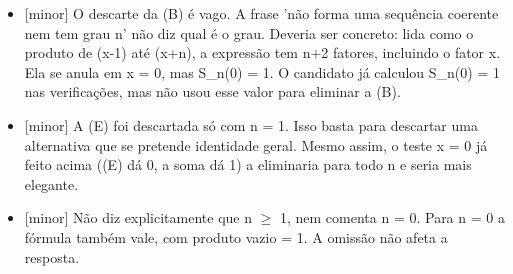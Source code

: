 \documentclass{article}%
\begin{document}
\begin{itemize}%
\item%
{[}minor{]} O descarte da (B) é vago. A frase 'não forma uma sequência coerente nem tem grau n' não diz qual é o grau. Deveria ser concreto: lida como o produto de (x-1) até (x+n), a expressão tem n+2 fatores, incluindo o fator x. Ela se anula em x = 0, mas S\_n(0) = 1. O candidato já calculou S\_n(0) = 1 nas verificações, mas não usou esse valor para eliminar a (B).%
\item%
{[}minor{]} A (E) foi descartada só com n = 1. Isso basta para descartar uma alternativa que se pretende identidade geral. Mesmo assim, o teste x = 0 já feito acima ((E) dá 0, a soma dá 1) a eliminaria para todo n e seria mais elegante.%
\item%
{[}minor{]} Não diz explicitamente que n $\geq$ 1, nem comenta n = 0. Para n = 0 a fórmula também vale, com produto vazio = 1. A omissão não afeta a resposta.%
\end{itemize}%
\end{document}
